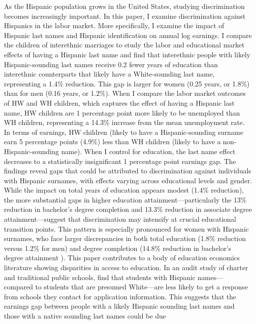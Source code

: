 As the Hispanic population grows in the United States, studying discrimination becomes increasingly important. In this paper, I examine discrimination against Hispanics in the labor market. More specifically, I examine the impact of Hispanic last names and Hispanic identification on annual log earnings.
I compare the children of interethnic marriages to study the labor and educational market effects of having a Hispanic last name and find that interethnic people with likely Hispanic-sounding last names receive 0.2 fewer years of education than interethnic counterparts that likely have a White-sounding  last name, representing a 1.4\% reduction. This gap is larger for women (0.25 years, or 1.8\%) than for men (0.16 years, or 1.2\%). When I compare the labor market outcomes of HW and WH children, which captures the effect of having a Hispanic last name, HW children are 1 percentage point more likely to be unemployed than WH children, representing a 14.3\% increase from the mean unemployment rate. In terms of earnings, HW children (likely to have a Hispanic-sounding surname earn 5 percentage points (4.9\%) less than WH children (likely to have a non-Hispanic-sounding name). When I control for education, the last name effect decreases to a statistically insignificant 1 percentage point earnings gap.
The findings reveal gaps that could be attributed to discrimination against individuals with Hispanic surnames, with effects varying across educational levels and gender. While the impact on total years of education appears modest (1.4\% reduction), the more substantial gaps in higher education attainment—particularly the 13\% reduction in bachelor’s degree completion and 13.3\% reduction in associate degree attainment—suggest that discrimination may intensify at crucial educational transition points. This pattern is especially pronounced for women with Hispanic surnames, who face larger discrepancies in both total education (1.8\% reduction versus 1.2\% for men) and degree completion (14.8\% reduction in bachelor’s degree attainment ).
This paper contributes to a body of education economics literature showing disparities in access to education. In an audit study of charter and traditional public schools, \textcite{bergman2018education,gaddis2024racial} find that students  with Hispanic names—compared to students that are presumed White—are less likely to get a response from schools they contact for application information. This suggests that the earnings gap between people with a likely Hispanic sounding last names and those with a native  sounding last names could be due
 
